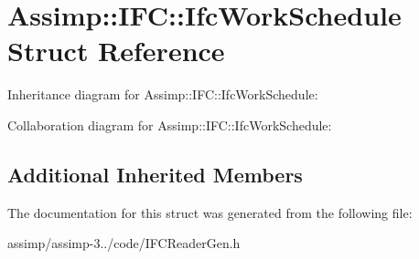 \hypertarget{struct_assimp_1_1_i_f_c_1_1_ifc_work_schedule}{\section{Assimp\+:\+:I\+F\+C\+:\+:Ifc\+Work\+Schedule Struct Reference}
\label{struct_assimp_1_1_i_f_c_1_1_ifc_work_schedule}
}


Inheritance diagram for Assimp\+:\+:I\+F\+C\+:\+:Ifc\+Work\+Schedule\+:


Collaboration diagram for Assimp\+:\+:I\+F\+C\+:\+:Ifc\+Work\+Schedule\+:
\subsection*{Additional Inherited Members}


The documentation for this struct was generated from the following file\+:\begin{DoxyCompactItemize}
\item 
assimp/assimp-\/3../code/I\+F\+C\+Reader\+Gen.\+h\end{DoxyCompactItemize}
